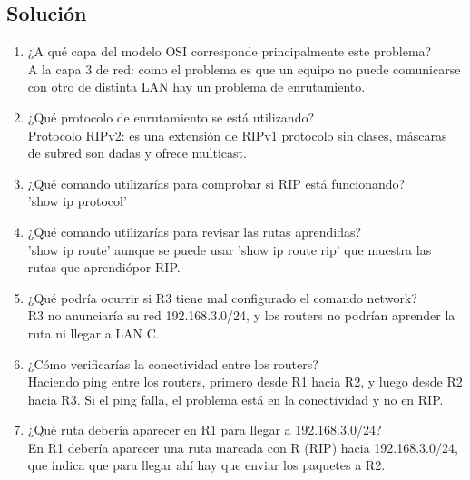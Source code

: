 \subsection*{Solución}
\begin{enumerate}[label=\arabic*., leftmargin=*]
    \item ¿A qué capa del modelo OSI corresponde principalmente este problema?\\
    A la capa 3 de red: como el problema es que un equipo no puede comunicarse con otro de distinta 
    LAN hay un problema de enrutamiento.

    \item ¿Qué protocolo de enrutamiento se está utilizando?\\
    Protocolo RIPv2: es una extensi\'on de RIPv1 protocolo sin clases, m\'ascaras de subred son dadas y ofrece multicast.

    \item ¿Qué comando utilizarías para comprobar si RIP está funcionando?\\
    'show ip protocol'

    \item ¿Qué comando utilizarías para revisar las rutas aprendidas?\\
    'show ip route' aunque se puede usar 'show ip route rip' que muestra las rutas que aprendi\'opor RIP. 

    \item ¿Qué podría ocurrir si R3 tiene mal configurado el comando network?\\
    R3 no anunciar\'ia su red 192.168.3.0/24, y los routers no podr\'ian aprender la ruta ni llegar a LAN C.

    \item ¿Cómo verificarías la conectividad entre los routers?\\
    Haciendo ping entre los routers, primero desde R1 hacia R2, y luego desde R2 hacia R3. Si el ping 
    falla, el problema está en la conectividad y no en RIP.

    \item ¿Qué ruta debería aparecer en R1 para llegar a 192.168.3.0/24?\\
    En R1 debería aparecer una ruta marcada con R (RIP) hacia 192.168.3.0/24, que indica que para llegar ahí hay que enviar los paquetes a R2.

\end{enumerate}